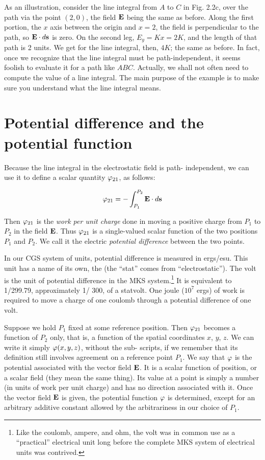 As an illustration, consider the line integral from $A$ to $C$ in Fig. 2.2c,
over the path via the point $(2,0)$, the field $\mathbf{E}$ being the same as before.
Along the first portion, the $x$ axis between the origin and $x = 2$, the
field is perpendicular to the path, so $\mathbf{E}\cdot d\mathbf{s}$ is zero. On the second leg,
$E_y = Kx = 2K$, and the length of that path is 2 units. We get for the
line integral, then, $4K$; the same as before. In fact, once we recognize
that the line integral must be path-independent, it seems foolish to
evaluate it for a path like $ABC$. Actually, we shall not often need to
compute the value of a line integral. The main purpose of the example
is to make sure you understand what the line integral means.

\section{Potential difference and the potential function}
Because the line integral in the electrostatic field is path-
independent, we can use it to define a scalar quantity $\varphi_{21}$, as follows:
\begin{framed}
\begin{equation}
  \varphi_{21} = -\int_{P_1}^{P_2} \mathbf{E}\cdot d\mathbf{s}
\end{equation}
\end{framed}
Then $\varphi_{21}$ is the \emph{work per unit charge} done in moving a positive
charge from $P_1$ to $P_2$ in the field $\mathbf{E}$. Thus $\varphi_{21}$ is a single-valued scalar
function of the two positions $P_1$ and $P_2$. We call it the electric
\emph{potential difference}
between the two points.

In our CGS system of units, potential difference is measured in
ergs/esu. This unit has a name of its own, the  (the ``stat''
comes from ``electrostatic''). The volt is the unit of potential difference
in the MKS system.\footnote{Like the coulomb, ampere, and
ohm, the volt was in common use as a ``practical''
electrical unit long before the complete MKS system of electrical units was contrived.}
It is equivalent to 1/299.79, approximately
1/ 300, of a statvolt. One joule ($10^7$ ergs) of work is required
to move a charge of one coulomb through a potential difference of
one volt.

Suppose we hold $P_1$ fixed at some reference position. Then $\varphi_{21}$
becomes a function of $P_2$ only, that is, a function of the spatial coordinates
$x$, $y$, $z$. We can write it simply $\varphi(x,y,z)$, without the sub-
scripts, if we remember that its definition still involves agreement
on a reference point $P_1$. We say that $\varphi$ is the potential associated with
the vector field $\mathbf{E}$. It is a scalar function of position, or a scalar field
(they mean the same thing). Its value at a point is simply a number
(in units of work per unit charge) and has no direction associated
with it. Once the vector field $\mathbf{E}$ is given, the potential function $\varphi$
is determined, except for an arbitrary additive constant allowed by
the arbitrariness in our choice of $P_1$.

